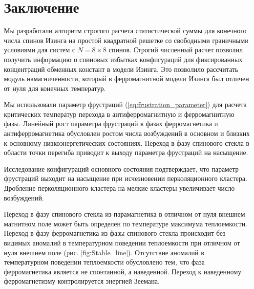 \chapter*{Заключение}                       %


%

Мы разработали алгоритм строгого расчета статистической суммы для конечного числа спинов Изинга на простой квадратной решетке со свободными граничными условиями для систем с $N=8\times8$ спинов. Строгий численный расчет позволил получить информацию о спиновых избытках конфигураций для фиксированных концентраций обменных констант в модели Изинга. Это позволило рассчитать модуль намагниченности, который в ферромагнитной модели Изинга был отличен от нуля для конечных температур.

Мы использовали параметр фрустраций (\ref{eq:frustration_parameter}) для расчета критических температур перехода в антиферромагнитную и ферромагнитную фазы. Линейный рост параметра фрустраций в фазах ферромагнетика и антиферромагнетика обусловлен ростом числа возбуждений в основном и близких к основному низкоэнергетических состояниях. Переход в фазу спинового стекла в области точки перегиба приводит к выходу параметра фрустраций на насыщение. 

Исследование конфигураций основного состояния подтверждает, что параметр фрустраций выходит на насыщение при исчезновении перколяционного кластера. Дробление перколяционного кластера на мелкие кластеры увеличивает число возбуждений.

Переход в фазу спинового стекла из парамагнетика в отличном от нуля внешнем магнитном поле может быть определен по температуре максимума теплоемкости. Переход в фазу ферромагнетика из фазы спинового стекла происходит без видимых аномалий в температурном поведении теплоемкости при отличном от нуля внешнем поле (рис. \ref{fig:Stable_line}). Отсутствие аномалий в температурном поведении теплоемкости обусловлено тем, что фаза ферромагнетика является не спонтанной, а наведенной. Переход к наведенному ферромагнетизму контролируется энергией Зеемана. 

